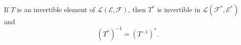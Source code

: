 If $T$ is an invertible element of $\mathcal{L}(\mathcal{E}, \mathcal{F})$, then $T^*$ is invertible in $\mathcal{L}(\mathcal{F}^*, \mathcal{E}^*)$ and
$$(T^*)^{-1} = (T^{-1})^*.$$
